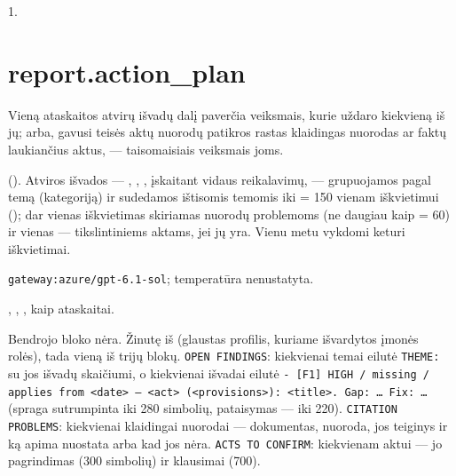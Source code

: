  1.


\section{report.action\_plan}\label{sec:aprompts:report-action_plan}

 Vieną ataskaitos atvirų išvadų dalį paverčia veiksmais, kurie uždaro
kiekvieną iš jų; arba, gavusi teisės aktų nuorodų patikros rastas klaidingas nuorodas ar faktų
laukiančius aktus, --- taisomaisiais veiksmais joms.

  (). Atviros
išvados --- , , , įskaitant vidaus reikalavimų, ---
grupuojamos pagal temą (kategoriją) ir sudedamos ištisomis temomis iki
 = 150 vienam iškvietimui (); dar vienas
iškvietimas skiriamas nuorodų problemoms (ne daugiau kaip  = 60) ir
vienas --- tikslintiniems aktams, jei jų yra. Vienu metu vykdomi keturi iškvietimai.

 \texttt{gateway:azure/gpt-6.1-sol}; temperatūra
nenustatyta.

 , , , kaip
ataskaitai.

 Bendrojo bloko nėra. Žinutę iš  (glaustas
profilis, kuriame išvardytos įmonės rolės), tada vieną iš trijų blokų. \texttt{OPEN FINDINGS}:
kiekvienai temai eilutė \texttt{THEME:} su jos išvadų skaičiumi, o kiekvienai išvadai eilutė
\texttt{- [F1] HIGH / missing / applies from <date> — <act> (<provisions>): <title>. Gap: … Fix: …}
(spraga sutrumpinta iki 280 simbolių, pataisymas --- iki 220). \texttt{CITATION PROBLEMS}:
kiekvienai klaidingai nuorodai --- dokumentas, nuoroda, jos teiginys ir ką apima nuostata arba
kad jos nėra. \texttt{ACTS TO CONFIRM}: kiekvienam aktui --- jo pagrindimas (300 simbolių) ir
klausimai (700).

